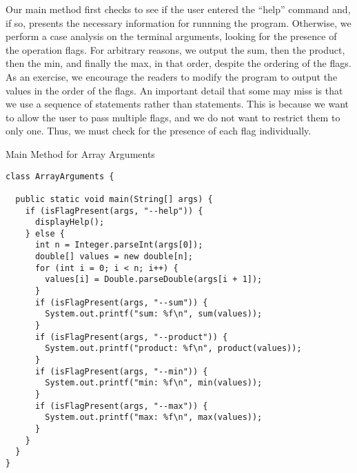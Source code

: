 Our main method first checks to see if the user entered the ``help'' command and, if so, presents the necessary information for runnning the program. Otherwise, we perform a case analysis on the terminal arguments, looking for the presence of the operation flags. For arbitrary reasons, we output the sum, then the product, then the min, and finally the max, in that order, despite the ordering of the flags. As an exercise, we encourage the readers to modify the program to output the values in the order of the flags. An important detail that some may miss is that we use a sequence of  statements rather than  statements. This is because we want to allow the user to pass multiple flags, and we do not want to restrict them to only one. Thus, we must check for the presence of each flag individually.

\begin{cl}[]{Main Method for Array Arguments}
\begin{lstlisting}[language=MyJava]
class ArrayArguments {

  public static void main(String[] args) {
    if (isFlagPresent(args, "--help")) {
      displayHelp();
    } else {
      int n = Integer.parseInt(args[0]);
      double[] values = new double[n];
      for (int i = 0; i < n; i++) { 
        values[i] = Double.parseDouble(args[i + 1]); 
      }
      if (isFlagPresent(args, "--sum")) { 
        System.out.printf("sum: %f\n", sum(values)); 
      }
      if (isFlagPresent(args, "--product")) { 
        System.out.printf("product: %f\n", product(values)); 
      }
      if (isFlagPresent(args, "--min")) { 
        System.out.printf("min: %f\n", min(values)); 
      }
      if (isFlagPresent(args, "--max")) { 
        System.out.printf("max: %f\n", max(values)); 
      }
    }
  }
}
\end{lstlisting}
\end{cl}


